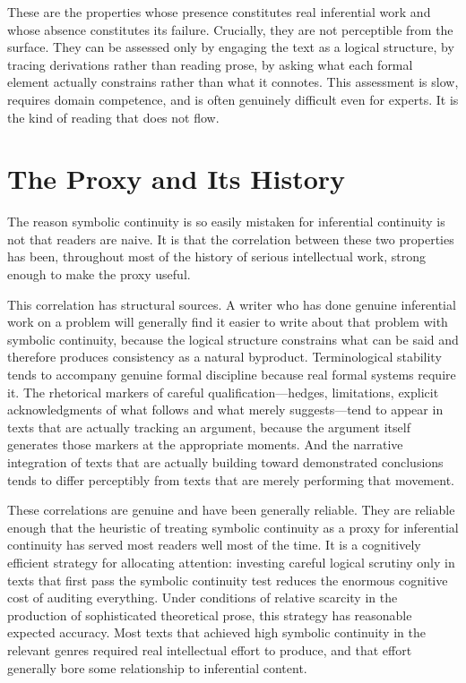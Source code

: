 \documentclass[12pt, openright, twoside]{book}
\begin{document}
These are the properties whose presence constitutes real inferential work and
whose absence constitutes its failure. Crucially, they are not perceptible from
the surface. They can be assessed only by engaging the text as a logical structure,
by tracing derivations rather than reading prose, by asking what each formal
element actually constrains rather than what it connotes. This assessment is slow,
requires domain competence, and is often genuinely difficult even for experts.
It is the kind of reading that does not flow.

\section{The Proxy and Its History}

The reason symbolic continuity is so easily mistaken for inferential continuity
is not that readers are naive. It is that the correlation between these two
properties has been, throughout most of the history of serious intellectual work,
strong enough to make the proxy useful.

This correlation has structural sources. A writer who has done genuine inferential
work on a problem will generally find it easier to write about that problem with
symbolic continuity, because the logical structure constrains what can be said
and therefore produces consistency as a natural byproduct. Terminological stability
tends to accompany genuine formal discipline because real formal systems require
it. The rhetorical markers of careful qualification---hedges, limitations, explicit
acknowledgments of what follows and what merely suggests---tend to appear in texts
that are actually tracking an argument, because the argument itself generates
those markers at the appropriate moments. And the narrative integration of texts
that are actually building toward demonstrated conclusions tends to differ
perceptibly from texts that are merely performing that movement.

These correlations are genuine and have been generally reliable. They are reliable
enough that the heuristic of treating symbolic continuity as a proxy for inferential
continuity has served most readers well most of the time. It is a cognitively
efficient strategy for allocating attention: investing careful logical scrutiny
only in texts that first pass the symbolic continuity test reduces the enormous
cognitive cost of auditing everything. Under conditions of relative scarcity in
the production of sophisticated theoretical prose, this strategy has reasonable
expected accuracy. Most texts that achieved high symbolic continuity in the
relevant genres required real intellectual effort to produce, and that effort
generally bore some relationship to inferential content.
\end{document}
